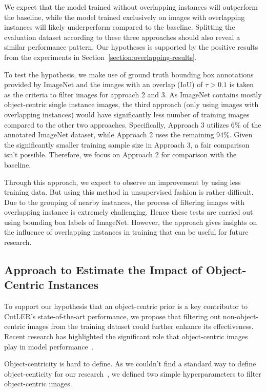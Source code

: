 We expect that the model trained without overlapping instances will outperform the baseline, while the model trained exclusively on images with overlapping instances will likely underperform compared to the baseline. Splitting the evaluation dataset according to these three approaches should also reveal a similar performance pattern. Our hypotheses is supported by the positive results from the experiments in Section~\ref{section:overlapping-results}.

To test the hypothesis, we make use of ground truth bounding box annotations provided by ImageNet and the images with an overlap (IoU) of \(\tau > \text{0.1}\) is taken as the criteria to filter images for approach 2 and 3. As ImageNet contains mostly object-centric single instance images, the third approach (only using images with overlapping instances) would have significantly less number of training images compared to the other two approaches. Specifically, Approach 3 utilizes 6\% of the annotated ImageNet dataset, while Approach 2 uses the remaining 94\%. Given the significantly smaller training sample size in Approach 3, a fair comparison isn't possible. Therefore, we focus on Approach 2 for comparison with the baseline.

Through this approach, we expect to observe an improvement by using less training data. But using this method in unsupervised fashion is rather difficult. Due to the grouping of nearby instances, the process of filtering images with overlapping instance is extremely challenging. Hence these tests are carried out using bounding box labels of ImageNet. However, the approach gives insights on the influence of overlapping instances in training that can be useful for future research.

\subsection{Approach to Estimate the Impact of Object-Centric Instances}
\label{section:analysis_oc_instancs}
To support our hypothesis that an object-centric prior is a key contributor to CutLER's state-of-the-art performance, we propose that filtering out non-object-centric images from the training dataset could further enhance its effectiveness. Recent research has highlighted the significant role that object-centric images play in model performance~\cite{engstler2023understanding, Gasparim_2021}.

Object-centricity is hard to define. As we couldn't find a standard way to define object-centicity for our research~\cite{Russakovsky, Gasparim_2021}, we defined two simple hyperparameters to filter object-centric images.

